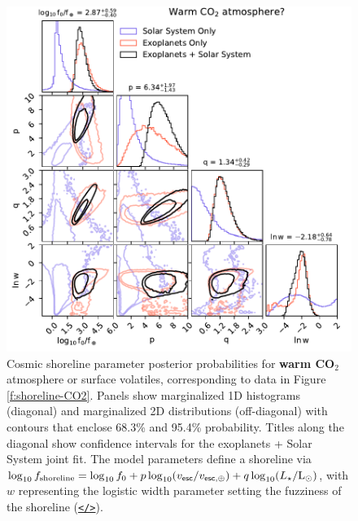 \documentclass[modern,linenumbers,trackchanges]{aastex7}
\begin{document}
\begin{figure}[ht!]
\includegraphics[width=\textwidth]{figures/posteriors-CO2.pdf}

\caption{Cosmic shoreline parameter posterior probabilities for {\bf warm CO$_2$} atmosphere or surface volatiles, corresponding to data in Figure \ref{f:shoreline-CO2}. Panels show marginalized 1D histograms (diagonal) and marginalized 2D distributions (off-diagonal) with contours that enclose 68.3\% and 95.4\% probability. Titles along the diagonal show confidence intervals for the exoplanets + Solar System joint fit. The model parameters define a shoreline via $\log_{10} f_{\rm shoreline} = \log_{10} f_{0} + p \log_{10} (v_{\sf esc}/v_{\sf esc, \oplus}) + q \log_{10} (L_\star/\mathrm{L_\odot})$, with $w$ representing the logistic width parameter setting the fuzziness of the shoreline (\href{https://github.com/zkbt/shoreline/blob/main/notebooks/print-and-visualize-posteriors.ipynb}{\texttt{</>}}).}
\label{f:posteriors-CO2}
\end{figure}
\end{document}
